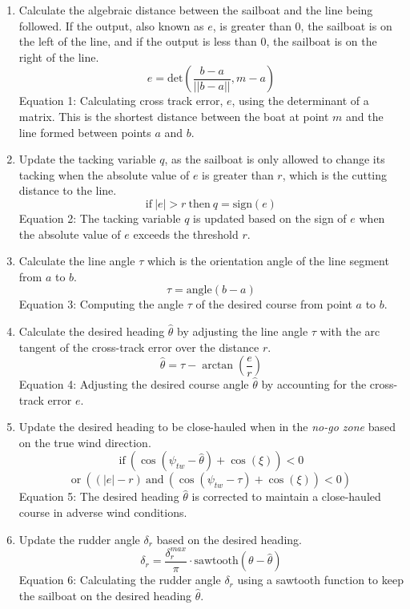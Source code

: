 \documentclass{article}
\begin{document}
\begin{enumerate}
    \item Calculate the algebraic distance between the sailboat and the line being followed. If the output, also known as \( e \), is greater than 0, the sailboat is on the left of the line, and if the output is less than 0, the sailboat is on the right of the line. 
    \[e = \text{det}\left(\frac{b - a}{||b - a||}, m - a\right)\]
    {\tiny Equation 1: Calculating cross track error, \( e \), using the determinant of a matrix. This is the shortest distance between the boat at point \( m \) and the line formed between points \( a \) and \( b \).}

    \item Update the tacking variable \( q \), as the sailboat is only allowed to change its tacking when the absolute value of \( e \) is greater than \( r \), which is the cutting distance to the line.
    \[ \text{if} \ |e| > r \ \text{then} \ q = \text{sign}(e) \]
    {\tiny Equation 2: The tacking variable \( q \) is updated based on the sign of \( e \) when the absolute value of \( e \) exceeds the threshold \( r \).}

    \item Calculate the line angle \( \tau \) which is the orientation angle of the line segment from \( a \) to \( b \).
    \[\tau = \text{angle}(b - a)\]
    {\tiny Equation 3: Computing the angle \( \tau \) of the desired course from point \( a \) to \( b \).}

    \item Calculate the desired heading \( \hat{\theta} \) by adjusting the line angle \( \tau \) with the arc tangent of the cross-track error over the distance \( r \).
    \[\hat{\theta} = \tau - \arctan\left(\frac{e}{r}\right)\]
    {\tiny Equation 4: Adjusting the desired course angle \( \hat{\theta} \) by accounting for the cross-track error \( e \).}

    \item Update the desired heading to be close-hauled when in the \textit{no-go zone} based on the true wind direction.
    \[ \text{if} \ \left(\cos(\psi_{tw} - \hat{\theta}) + \cos(\xi)\right) < 0 \]
    \[ \text{or} \ \left(\left(|e| - r\right) \ \text{and} \ \left(\cos(\psi_{tw} - \tau) + \cos(\xi)\right) < 0\right) \]
    {\tiny Equation 5: The desired heading \( \hat{\theta} \) is corrected to maintain a close-hauled course in adverse wind conditions.}

    \item Update the rudder angle \( \delta_r \) based on the desired heading.
    \[\delta_r = \frac{\delta_r^{max}}{\pi} \cdot \text{sawtooth}(\theta - \hat{\theta})\]
    {\tiny Equation 6: Calculating the rudder angle \( \delta_r \) using a sawtooth function to keep the sailboat on the desired heading \( \hat{\theta} \).}


\end{enumerate}
\end{document}
